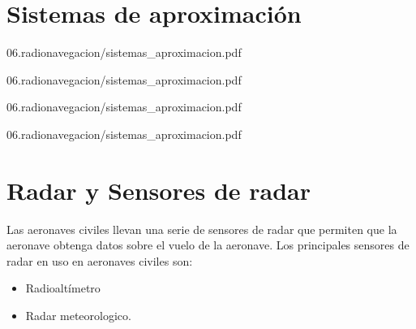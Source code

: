 \section{Sistemas de aproximaci\'on}
\label{sec:06.sistemas.de.aproximacion}





  
  {06.radionavegacion/sistemas_aproximacion.pdf}

  \begin{landscape}
  
{06.radionavegacion/sistemas_aproximacion.pdf}
\end{landscape}

  
  {06.radionavegacion/sistemas_aproximacion.pdf}


  \begin{landscape}
  
{06.radionavegacion/sistemas_aproximacion.pdf}
\end{landscape}


\section{Radar y Sensores de radar}
\label{sec:U06.05.sensores.de.radar}

Las aeronaves civiles llevan una serie de sensores de radar que permiten que la aeronave obtenga datos sobre el vuelo de la aeronave. Los principales sensores de radar en uso en aeronaves civiles son:

\begin{itemize}
\item Radioaltímetro

\item   Radar meteorologico.
\end{itemize}

